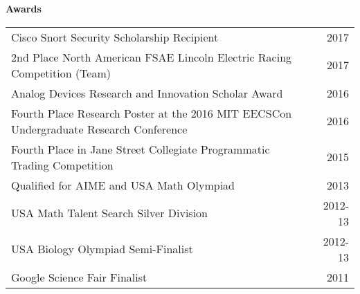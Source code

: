 \documentclass[letterpaper,11pt]{article}
\begin{document}
\vspace{0.1in}
\large \textbf{Awards\vspace{2mm}} \normalsize
	 \begin{tabular*}{7in}{l@{\extracolsep{\fill}}r}
		 \hspace{2mm} Cisco Snort Security Scholarship Recipient & 2017\\
		 \hspace{2mm} 2nd Place North American FSAE Lincoln Electric Racing Competition (Team) & 2017\\
		 \hspace{2mm} Analog Devices Research and Innovation Scholar Award & 2016\\
		 \hspace{2mm} Fourth Place Research Poster at the 2016 MIT EECSCon Undergraduate Research Conference & 2016\\
		 \hspace{2mm} Fourth Place in Jane Street Collegiate Programmatic Trading Competition & 2015\\
		 \hspace{2mm} Qualified for AIME and USA Math Olympiad & 2013\\
		 \hspace{2mm} USA Math Talent Search Silver Division & 2012-13\\
		 \hspace{2mm} USA Biology Olympiad Semi-Finalist & 2012-13\\
		 \hspace{2mm} Google Science Fair Finalist & 2011\\
	\end{tabular*}
\end{document}
